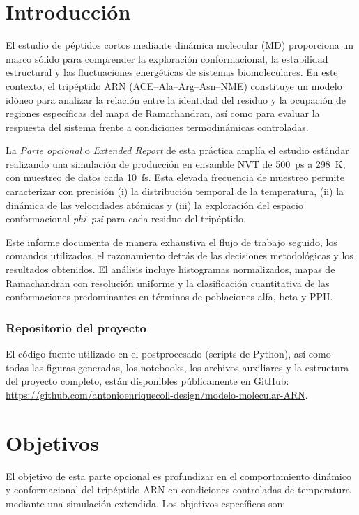 \documentclass[12pt,a4paper]{article}
\begin{document}
\tableofcontents
\newpage

\section{Introducción}

El estudio de péptidos cortos mediante dinámica molecular (MD) proporciona un marco sólido para comprender la exploración conformacional, la estabilidad estructural y las fluctuaciones energéticas de sistemas biomoleculares. En este contexto, el tripéptido ARN (ACE--Ala--Arg--Asn--NME) constituye un modelo idóneo para analizar la relación entre la identidad del residuo y la ocupación de regiones específicas del mapa de Ramachandran, así como para evaluar la respuesta del sistema frente a condiciones termodinámicas controladas.

La \textit{Parte opcional} o \textit{Extended Report} de esta práctica amplía el estudio estándar realizando una simulación de producción en ensamble NVT de \SI{500}{ps} a \SI{298}{K}, con muestreo de datos cada \SI{10}{fs}. Esta elevada frecuencia de muestreo permite caracterizar con precisión (i) la distribución temporal de la temperatura, (ii) la dinámica de las velocidades atómicas y (iii) la exploración del espacio conformacional \textit{phi--psi} para cada residuo del tripéptido.

Este informe documenta de manera exhaustiva el flujo de trabajo seguido, los comandos utilizados, el razonamiento detrás de las decisiones metodológicas y los resultados obtenidos. El análisis incluye histogramas normalizados, mapas de Ramachandran con resolución uniforme y la clasificación cuantitativa de las conformaciones predominantes en términos de poblaciones alfa, beta y PPII.

\subsubsection*{Repositorio del proyecto}
El código fuente utilizado en el postprocesado (scripts de Python), así como todas
las figuras generadas, los notebooks, los archivos auxiliares y la estructura del
proyecto completo, están disponibles públicamente en GitHub:
\url{https://github.com/antonioenriquecoll-design/modelo-molecular-ARN}.

\section{Objetivos}

El objetivo de esta parte opcional es profundizar en el comportamiento dinámico y conformacional del tripéptido ARN en condiciones controladas de temperatura mediante una simulación extendida. Los objetivos específicos son:
\end{document}
